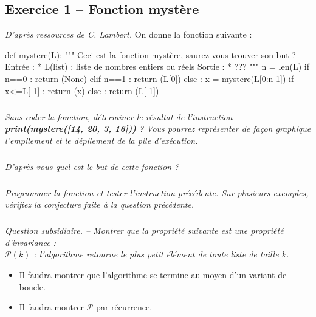 
\subsection*{Exercice 1 -- Fonction mystère}

\ifprof
\else
\textit{D'après ressources de C. Lambert.}
On donne la fonction suivante : 
\begin{py}
\begin{python}
def mystere(L):
    """
    Ceci est la fonction mystère, saurez-vous 
    trouver son but ?
    Entrée : 
        * L(list) : liste de nombres entiers
    ou réels
    Sortie : 
        * ??? 
    """
    n = len(L)
    if n==0 :
        return (None)
    elif n==1 :
        return (L[0])
    else :
        x = mystere(L[0:n-1])
        if x<=L[-1] :
            return (x)
        else : 
            return (L[-1])
\end{python}
\end{py}
\fi
\subparagraph{}
\textit{Sans coder la fonction, déterminer le résultat de l'instruction \textbf{print(mystere([14, 20, 3, 16]))} ? Vous pourrez représenter de façon graphique l'empilement et le dépilement de la pile d'exécution.}

\subparagraph{}
\textit{D'après vous quel est le but de cette fonction ?}

\subparagraph{}
\textit{Programmer la fonction et tester l'instruction précédente. Sur plusieurs exemples, vérifiez la conjecture faite à la question précédente.}


\subparagraph{}
\textit{Question subsidiaire. -- Montrer que la propriété suivante est une propriété d'invariance :\\
$\mathcal{P}(k)$ : l'algorithme retourne le plus petit élément de toute liste de taille $k$.}
\ifprof
\else

\begin{rem}
\begin{itemize}
\item Il faudra montrer que l'algorithme se termine au moyen d'un variant de boucle. 
\item Il faudra montrer $\mathcal{P}$ par récurrence. 
\end{itemize}
\end{rem}
\fi

